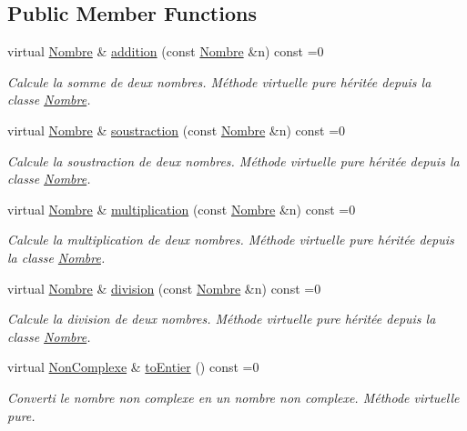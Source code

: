 \subsection*{\-Public \-Member \-Functions}
\begin{DoxyCompactItemize}
\item 
virtual \hyperlink{classNombre}{\-Nombre} \& \hyperlink{classNonComplexe_a1ed6f047d5c576f03616535e3e92ab39}{addition} (const \hyperlink{classNombre}{\-Nombre} \&n) const =0
\begin{DoxyCompactList}\small\item\em \-Calcule la somme de deux nombres. \-Méthode virtuelle pure héritée depuis la classe \hyperlink{classNombre}{\-Nombre}. \end{DoxyCompactList}\item 
virtual \hyperlink{classNombre}{\-Nombre} \& \hyperlink{classNonComplexe_ac7e41f7e2f5422687985a5fe501e243f}{soustraction} (const \hyperlink{classNombre}{\-Nombre} \&n) const =0
\begin{DoxyCompactList}\small\item\em \-Calcule la soustraction de deux nombres. \-Méthode virtuelle pure héritée depuis la classe \hyperlink{classNombre}{\-Nombre}. \end{DoxyCompactList}\item 
virtual \hyperlink{classNombre}{\-Nombre} \& \hyperlink{classNonComplexe_a7343c4742a895813a4b031fb67170dc8}{multiplication} (const \hyperlink{classNombre}{\-Nombre} \&n) const =0
\begin{DoxyCompactList}\small\item\em \-Calcule la multiplication de deux nombres. \-Méthode virtuelle pure héritée depuis la classe \hyperlink{classNombre}{\-Nombre}. \end{DoxyCompactList}\item 
virtual \hyperlink{classNombre}{\-Nombre} \& \hyperlink{classNonComplexe_a1af698f4c7d50e69f2c7dfa3e7998cdd}{division} (const \hyperlink{classNombre}{\-Nombre} \&n) const =0
\begin{DoxyCompactList}\small\item\em \-Calcule la division de deux nombres. \-Méthode virtuelle pure héritée depuis la classe \hyperlink{classNombre}{\-Nombre}. \end{DoxyCompactList}\item 
virtual \hyperlink{classNonComplexe}{\-Non\-Complexe} \& \hyperlink{classNonComplexe_af5751554285a6bf0bb1433a059bbfcdd}{to\-Entier} () const =0
\begin{DoxyCompactList}\small\item\em \-Converti le nombre non complexe en un nombre non complexe. \-Méthode virtuelle pure. \end{DoxyCompactList}\item 

\end{DoxyCompactItemize}
